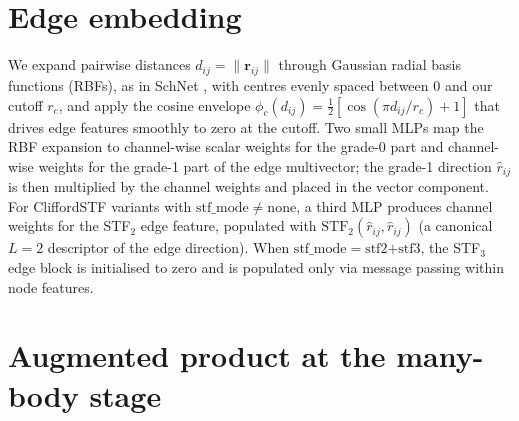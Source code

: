 \section{Edge embedding}\label{supp:edge_embed}

We expand pairwise distances $d_{ij} = \lVert\mathbf{r}_{ij}\rVert$ through Gaussian radial basis functions (RBFs), as in SchNet \citep{schutt2017schnet}, with centres evenly spaced between 0 and our cutoff $r_c$, and apply the cosine envelope $\phi_c(d_{ij}) = \tfrac{1}{2}[\cos(\pi d_{ij}/r_c) + 1]$ that drives edge features smoothly to zero at the cutoff. Two small MLPs map the RBF expansion to channel-wise scalar weights for the grade-0 part and channel-wise weights for the grade-1 part of the edge multivector; the grade-1 direction $\hat{r}_{ij}$ is then multiplied by the channel weights and placed in the vector component. For CliffordSTF variants with $\mathrm{stf\_mode} \neq \text{none}$, a third MLP produces channel weights for the STF$_2$ edge feature, populated with $\mathrm{STF}_2(\hat{r}_{ij}, \hat{r}_{ij})$ (a canonical $L{=}2$ descriptor of the edge direction). When $\mathrm{stf\_mode}=\text{stf2+stf3}$, the STF$_3$ edge block is initialised to zero and is populated only via message passing within node features.

\section{Augmented product at the many-body stage}\label{supp:aug_prod}


